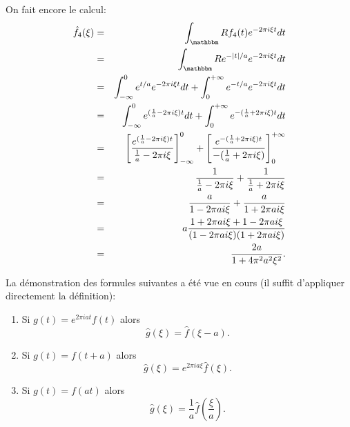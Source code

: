 \begin{exercice}
\begin{enumerate}
 On fait encore le calcul:
 \begin{eqnarray*}
  \hat{f}_4 (\xi) & = & \int_\eR f_4(t) e^{-2\pi i \xi t} dt\\
  & = & \int_\eR e^{-|t|/a} e^{-2\pi i \xi t} dt\\
  & = & \int_{-\infty}^0 e^{t/a} e^{-2\pi i \xi t} dt + \int_0^{+\infty} e^{-t/a} e^{-2\pi i \xi t} dt\\
  & = & \int_{-\infty}^0 e^{(\frac1a -2\pi i \xi) t} dt + \int_0^{+\infty} e^{-(\frac1a + 2\pi i \xi ) t} dt\\
  & = & \left [ \frac{e^{(\frac1a -2\pi i \xi) t}}{\frac1a -2\pi i \xi} \right ]_{-\infty}^0 
  + \left [ \frac{e^{-(\frac1a + 2\pi i \xi ) t}}{-(\frac1a + 2\pi i \xi)} \right ]_{0}^{+\infty}\\
  & = & \frac1{\frac1a -2\pi i \xi}  
  + \frac1{\frac1a + 2\pi i \xi}\\
  & = & \frac{a}{1 -2\pi a i \xi}  
  + \frac{a}{1 + 2\pi a i \xi}\\
  & = & a \frac{1 + 2\pi a i \xi + 1 - 2\pi a i \xi}{(1 -2\pi a i \xi)(1 +2\pi a i \xi)}\\
  & = & \frac{2a}{1 + 4 \pi^2 a^2 \xi^2}.
  \end{eqnarray*}

 \end{enumerate}
 
\end{exercice}

\medskip

\begin{exercice}

La démonstration des formules suivantes a été vue en cours (il suffit d'appliquer directement la définition):
\begin{enumerate}
 \item Si $g(t) = e^{2\pi i a t} f(t)$ alors $$\hat{g}(\xi) = \hat{f} ( \xi - a).$$
 \item Si $g(t) = f(t + a)$ alors $$\hat{g}(\xi) = e^{2\pi i a \xi} \hat{f} ( \xi ).$$
 \item Si $g(t) = f(at)$ alors $$\hat{g}(\xi) = \frac1a \hat{f} \left ( \frac{\xi}{a} \right ).$$
\end{enumerate}
 
\end{exercice}



